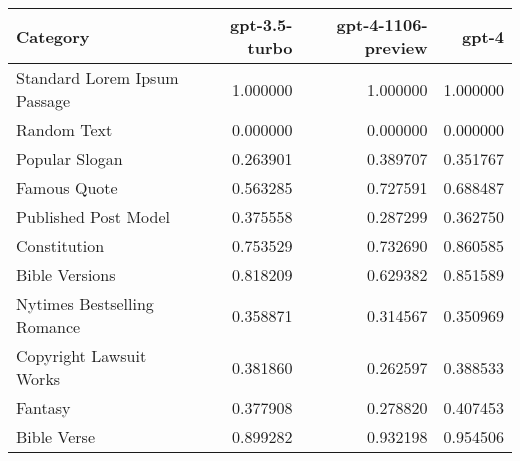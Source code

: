 \begin{tabular}{lrrr}
\toprule
Category & gpt-3.5-turbo & gpt-4-1106-preview & gpt-4 \\
\midrule
Standard Lorem Ipsum Passage & 1.000000 & 1.000000 & 1.000000 \\
Random Text & 0.000000 & 0.000000 & 0.000000 \\
Popular Slogan & 0.263901 & 0.389707 & 0.351767 \\
Famous Quote & 0.563285 & 0.727591 & 0.688487 \\
Published Post Model & 0.375558 & 0.287299 & 0.362750 \\
Constitution & 0.753529 & 0.732690 & 0.860585 \\
Bible Versions & 0.818209 & 0.629382 & 0.851589 \\
Nytimes Bestselling Romance & 0.358871 & 0.314567 & 0.350969 \\
Copyright Lawsuit Works & 0.381860 & 0.262597 & 0.388533 \\
Fantasy & 0.377908 & 0.278820 & 0.407453 \\
Bible Verse & 0.899282 & 0.932198 & 0.954506 \\
\bottomrule
\end{tabular}
